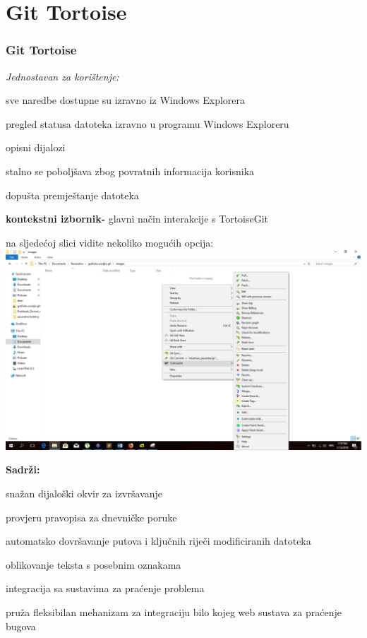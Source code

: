 \section{Git Tortoise}
\begin{frame}[allowframebreaks]
\frametitle{Git Tortoise}
\begin{itemize}
\item \textit{Jednostavan za korištenje:}
{\setlength\itemindent{15pt}\item sve naredbe dostupne su izravno iz Windows Explorera}
{\setlength\itemindent{15pt}\item pregled statusa datoteka izravno u programu Windows Exploreru}
{\setlength\itemindent{15pt}\item opisni dijalozi}
{\setlength\itemindent{15pt}\item stalno se poboljšava zbog povratnih informacija korisnika}
{\setlength\itemindent{15pt}\item dopušta premještanje datoteka}
\framebreak
\item \textbf{kontekstni izbornik-} glavni način interakcije s TortoiseGit
 \item na sljedećoj slici vidite nekoliko mogućih opcija: 
 \includegraphics[width=0.8\linewidth]{images/git_tortoise.jpg}
 \framebreak
 \item \textbf{Sadrži:}
 {\setlength\itemindent{15pt}\item snažan dijaloški okvir za izvršavanje}
 {\setlength\itemindent{15pt}\item provjeru pravopisa za dnevničke poruke}
 {\setlength\itemindent{15pt}\item automatsko dovršavanje putova i ključnih riječi modificiranih datoteka}
 {\setlength\itemindent{15pt}\item oblikovanje teksta s posebnim oznakama}
 \framebreak
 \item integracija sa sustavima za praćenje problema
 \item pruža fleksibilan mehanizam za integraciju bilo kojeg web sustava za praćenje bugova

\end{itemize}
\end{frame}

